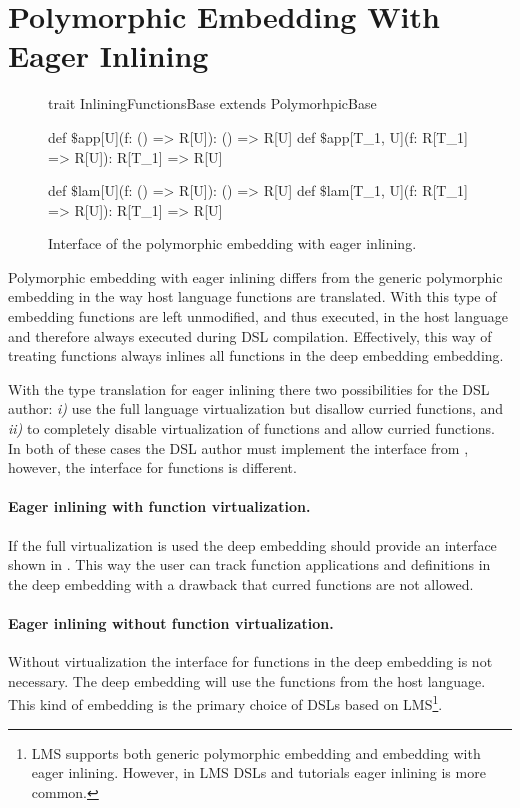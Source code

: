 \section{Polymorphic Embedding With Eager Inlining}
\label{sec:polymorphic-embedding-with-eager-inlining}
\begin{figure}
\begin{listingtiny}
trait InliningFunctionsBase extends PolymorhpicBase {
  def $\$$app[U](f: () => R[U]): () => R[U]
  def $\$$app[T_1, U](f: R[T_1] => R[U]): R[T_1] => R[U]

  def $\$$lam[U](f: () => R[U]): () => R[U]
  def $\$$lam[T_1, U](f: R[T_1] => R[U]): R[T_1] => R[U]
}
\end{listingtiny}
\caption{Interface of the polymorphic embedding with eager inlining.}
\label{fig:polymorphic-embedding-with-eager-inlining}
\end{figure}

Polymorphic embedding with eager inlining differs from the generic polymorphic embedding in
the way host language functions are translated. With this type of embedding functions
are left unmodified, and thus executed, in the host language and therefore always executed during DSL compilation. Effectively,
this way of treating functions always inlines all functions in the deep embedding embedding.

With the type translation for eager inlining there two possibilities for the DSL author:
\emph{i)} use the full language virtualization but disallow curried functions, and
\emph{ii)} to completely disable virtualization of functions and allow curried functions.
 In both of these cases the DSL author must implement the interface 
 from , however, the interface for functions is different.

\paragraph{Eager inlining with function virtualization.} If the full virtualization
is used the deep embedding should provide an interface shown in . This way the user can track function applications and definitions in the deep embedding with
a drawback that curred functions are not allowed.

\paragraph{Eager inlining without function virtualization.} Without virtualization the interface
for functions in the deep embedding is not necessary. The deep embedding will use the
functions from the host language. This kind of embedding is the primary choice of DSLs based on LMS\footnote{LMS supports both generic polymorphic embedding and embedding with eager inlining. However, in LMS DSLs and tutorials eager inlining is more common.}.


